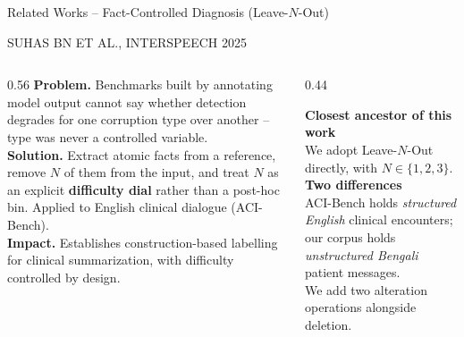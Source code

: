 \documentclass[aspectratio=169,11pt]{beamer}
\newcommand{\eyebrow}[1]{{\scriptsize\color{soft}\MakeUppercase{#1}}\\[1mm]}
\begin{document}
\begin{frame}{Related Works \;--\; Fact-Controlled Diagnosis (Leave-$N$-Out)}
\vspace{-1mm}
{\small
\eyebrow{Suhas BN et al., Interspeech 2025}
\begin{columns}[T]
\begin{column}{0.56\textwidth}\footnotesize
\textbf{Problem.} Benchmarks built by annotating model output cannot say whether detection degrades for one corruption type over another -- type was never a controlled variable.\\[1.5mm]
\textbf{Solution.} Extract atomic facts from a reference, remove $N$ of them from the input, and treat $N$ as an explicit \textbf{difficulty dial} rather than a post-hoc bin. Applied to English clinical dialogue (ACI-Bench).\\[1.5mm]
\textbf{Impact.} Establishes construction-based labelling for clinical summarization, with difficulty controlled by design.
\end{column}
\begin{column}{0.44\textwidth}\footnotesize
\colorbox{panel}{\begin{minipage}{\textwidth}\vspace{1mm}
\textbf{Closest ancestor of this work}\\[1.5mm]
We adopt Leave-$N$-Out directly, with $N \in \{1,2,3\}$.\\[2mm]
\textbf{Two differences}\\[1mm]
ACI-Bench holds \emph{structured English} clinical encounters; our corpus holds \emph{unstructured Bengali} patient messages.\\[1mm]
We add two alteration operations alongside deletion.
\vspace{1mm}\end{minipage}}
\end{column}
\end{columns}
}
\end{frame}
\end{document}
